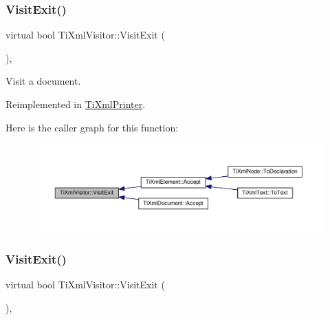 \subsubsection{\texorpdfstring{Visit\+Exit()}{VisitExit()}\hspace{0.1cm}{\footnotesize\ttfamily [1/2]}}
{\footnotesize\ttfamily virtual bool Ti\+Xml\+Visitor\+::\+Visit\+Exit (\begin{DoxyParamCaption}\item[{const \hyperlink{class_ti_xml_document}{Ti\+Xml\+Document} \&}]{ }\end{DoxyParamCaption})\hspace{0.3cm}{\ttfamily [inline]}, {\ttfamily [virtual]}}



Visit a document. 



Reimplemented in \hyperlink{class_ti_xml_printer_a0a636046fa589b6d7f3e5bd025b3f33e}{Ti\+Xml\+Printer}.

Here is the caller graph for this function\+:
\nopagebreak
\begin{figure}[H]
\begin{center}
\leavevmode
\includegraphics[width=350pt]{class_ti_xml_visitor_aa0ade4f27087447e93974e975c3246ad_icgraph}
\end{center}
\end{figure}
\mbox{\label{class_ti_xml_visitor_aec2b1f8116226d52f3a1b95dafd3a32c}} 
\subsubsection{\texorpdfstring{Visit\+Exit()}{VisitExit()}\hspace{0.1cm}{\footnotesize\ttfamily [2/2]}}
{\footnotesize\ttfamily virtual bool Ti\+Xml\+Visitor\+::\+Visit\+Exit (\begin{DoxyParamCaption}\item[{const \hyperlink{class_ti_xml_element}{Ti\+Xml\+Element} \&}]{ }\end{DoxyParamCaption})\hspace{0.3cm}{\ttfamily [inline]}, {\ttfamily [virtual]}}



